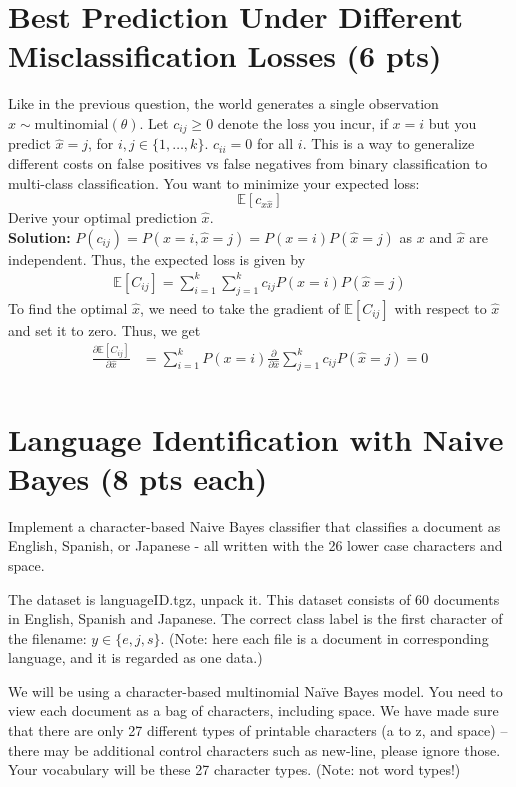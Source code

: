 \documentclass[a4paper]{article}
\theoremstyle{definition}
\def\E{\mathbb E}
\begin{document}
\section{Best Prediction Under Different Misclassification Losses (6 pts)}
Like in the previous question, 
the world generates a single observation $x \sim \mbox{multinomial}(\theta)$.
Let $c_{ij} \ge 0$ denote the loss you incur, if $x=i$ but you predict $\hat x=j$, for $i,j \in \{1, \ldots, k\}$.
$c_{ii}=0$ for all $i$.
This is a way to generalize different costs on false positives vs false negatives from binary classification to multi-class classification.
You want to minimize your expected loss:
$$\E[c_{x \hat x}]$$
Derive your optimal prediction $\hat x$.
\\
\textbf{Solution:}
$P(c_{ij}) = P(x=i,\hat{x}=j) = P(x=i)P(\hat{x}=j)$ as $x$ and $\hat{x}$ are independent. Thus, the expected loss is given by
\begin{align*}
    \E[C_{ij}] = \sum_{i=1}^k \sum_{j=1}^k c_{ij} P(x=i)P(\hat{x}=j)
\end{align*}
To find the optimal $\hat{x}$, we need to take the gradient of $\E[C_{ij}]$ with respect to $\hat{x}$ and set it to zero. Thus, we get
\begin{align*}
    \frac{\partial \E[C_{ij}]}{\partial \hat{x}} &= \sum_{i=1}^{k} P(x=i) \frac{\partial }{\partial \hat{x}} \sum_{j=1}^{k} c_{ij} P(\hat{x}=j) = 0\\
\end{align*}




\section{Language Identification with Naive Bayes (8 pts each)}
Implement a character-based Naive Bayes classifier that classifies a document as English, Spanish, or Japanese - all written with the 26 lower case characters and space.

The dataset is languageID.tgz, unpack it.
This dataset consists of 60 documents in English, Spanish and Japanese. 
The correct class label is the first character of the filename: $y \in \{e, j, s\}$. (Note: here each file is a document in corresponding language, and it is regarded as one data.)

We will be using a character-based multinomial Naïve Bayes model.  You need to view each document as a bag of characters, including space.  We have made sure that there are only 27 different types of printable characters (a to z, and space) -- there may be additional control characters such as new-line, please ignore those.  Your vocabulary will be these 27 character types. (Note: not word types!)
\end{document}
